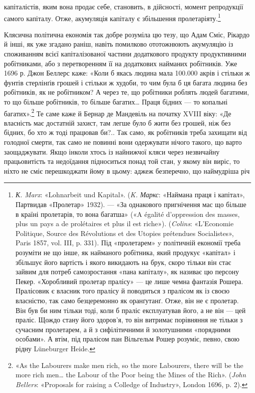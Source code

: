 капіталістів, яким вона продає себе, становить, в дійсності,
момент репродукції самого капіталу. Отже, акумуляція
капіталу є збільшення пролетаріяту.\footnote{
\emph{К. Marx}: «Lohnarbeit und Kapital». (\emph{K. Маркс}: «Наймана праця
і капітал», Партвидав «Пролетар» 1932). — «За однакового пригнічення
мас що більше в країні пролетарів, то вона багатша» («A égalité
d’oppression des masses, plus un pays a de prolétaires et plus il est riche»).
(\emph{Colins}: «L’Economie Politique, Source des Révolutions et des Utopies
prétendues Socialistes», Paris 1857, vol. III, p. 331). Під «пролетарем»
y політичній економії треба розуміти не що інше, як найманого робітника,
який продукує «капітал» і збільшує його вартість і якого викидають
на брук, скоро тільки він стає зайвим для потреб самозростання
«пана капіталу», як називає цю персону Пекер. «Хоробливий пролетар
пралісу» — це лише чемна фантазія Рошера. Пралісовик є власник того
пралісу й поводиться з пралісом як із своєю власністю, так само безцеремонно
як оранґутанґ. Отже, він не є пролетар. Він був би ним тільки
тоді, коли б праліс експлуатував його, а не він — цей праліс. Щождо
стану його здоров'я, то він витримає порівняння не тільки з сучасним
пролетарем, а й з сифілітичними й золотушними «порядними особами».
А втім, під пралісом пан Вільгельм Рошер розуміє, певно, свою рідну
Lüneburger Heide.
}

Клясична політична економія так добре розуміла цю тезу,
що Адам Сміс, Рікардо й інші, як уже згадано раніш, навіть помилково
ототожнюють акумуляцію із споживанням всієї капіталізованої
частини додаткового продукту продуктивними робітниками,
або з перетворенням її на додаткових найманих робітників.
Уже 1696 р. Джон Беллерс каже: «Коли б якась людина
мала 100.000 акрів і стільки ж фунтів стерлінґів грошей і стільки
ж худоби, то чим була б ця багата людина без робітників, як не
робітником? А через те, що робітники роблять людей багатими,
то що більше робітників, то більше багатих\dots{} Праця бідних — то
копальні багатих».\footnote{
«As the Labourers make men rich, so the more Labourers, there
will be the more rich men\dots{} the Labour of the Poor being the Mines of the
Rich». (\emph{John Bellers}: «Proposals for raising a Colledge of Industry»,
London 1696, p. 2).
} Те саме каже й Бернар де Мандевіль
на початку XVIII віку: «Де власність має достатній захист, там
легше було б жити без грошей, ніж без бідних, бо хто ж тоді
працював би?.. Так само, як робітників треба захищати від голодної
смерти, так само не повинні вони одержувати нічого
такого, що варто заощаджувати. Якщо інколи хтось із найнижчої
кляси через незвичайну працьовитість та недоїдання підноситься
понад той стан, у якому він виріс, то ніхто не сміє перешкоджати
йому в цьому: аджеж безперечно, що наймудріша річ
\parbreak{}  %
